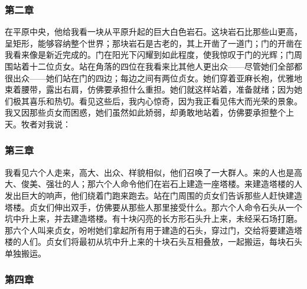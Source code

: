 
\subsubsection{第二章}

在平原中央，他给我看一块从平原升起的巨大白色岩石。这块岩石比那些山更高，呈矩形，能够容纳整个世界；那块岩石是古老的，其上开凿了一道门；门的开凿在我看来像是新近完成的。门在阳光下闪耀到如此程度，使我惊叹于门的光辉；门周围站着十二位贞女。站在角落的四位在我看来比其他人更出众——尽管她们全部都很出众——她们站在门的四边；每边之间有两位贞女。她们穿着亚麻长袍，优雅地束着腰带，露出右肩，仿佛要承担什么重担。她们就这样站着，准备就绪；因为她们极其喜乐和热切。看见这些后，我内心惊奇，因为我正看见伟大而光荣的景象。我又因那些贞女而困惑，她们虽然如此娇弱，却勇敢地站着，仿佛要承担整个上天。牧者对我说：\par


\subsubsection{第三章}

我看见六个人走来，高大、出众、样貌相似，他们召唤了一大群人。来的人也是高大、俊美、强壮的人；那六个人命令他们在岩石上建造一座塔楼。来建造塔楼的人发出巨大的响声，他们绕着门跑来跑去。站在门周围的贞女们告诉那些人赶快建造塔楼。贞女们伸出双手，仿佛要从那些人那里接受什么。那六个人命令石头从一个坑中升上来，并去建造塔楼。有十块闪亮的长方形石头升上来，未经采石场打磨。那六个人叫来贞女，吩咐她们拿起所有用于建造的石头，穿过门，交给将要建造塔楼的人们。贞女们将最初从坑中升上来的十块石头互相叠放，一起搬运，每块石头单独搬运。\par


\subsubsection{第四章}

